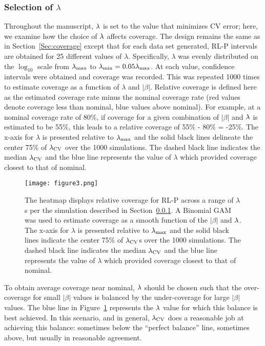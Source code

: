 \subsubsection{Selection of \texorpdfstring{$\lambda$}{lambda}} \label{Sec:lambda}

Throughout the manuscript, $\lambda$ is set to the value that minimizes CV error; here, we examine how the choice of $\lambda$ affects coverage. The design remains the same as in Section~\ref{Sec:coverage} except that for each data set generated, RL-P intervals are obtained for 25 different values of $\lambda$. Specifically, $\lambda$ was evenly distributed on the $\log_{10}$ scale from $\lambda_{\max}$ to $\lambda_{\min} = 0.05 \lambda_{\max}$. At each value, confidence intervals were obtained and coverage was recorded. This was repeated 1000 times to estimate coverage as a function of $\lambda$ and $|\beta|$. Relative coverage is defined here as the estimated coverage rate minus the nominal coverage rate (red values denote coverage less than nominal, blue values above nominal). For example, at a nominal coverage rate of 80\%, if coverage for a given combination of $|\beta|$ and $\lambda$ is estimated to be 55\%, this leads to a relative coverage of 55\% - 80\% = -25\%. The x-axis for $\lambda$ is presented relative to $\lambda_{\max}$ and the solid black lines delineate the center 75\% of $\lambda_{\textrm{CV}}$ over the 1000 simulations. The dashed black line indicates the median $\lambda_{\textrm{CV}}$ and the blue line represents the value of $\lambda$ which provided coverage closest to that of nominal.

\begin{figure}[htb!]
  \begin{center}
    \texttt{[image: figure3.png]}
    \caption{\label{Fig:beta_lambda_heatmap_laplace} The heatmap displays relative coverage for RL-P across a range of $\lambda$s per the simulation described in Section~\ref{Sec:lambda}. A Binomial GAM was used to estimate coverage as a smooth function of the $|\beta|$ and $\lambda$. The x-axis for $\lambda$ is presented relative to $\lambda_{\max}$ and the solid black lines indicate the center 75\% of $\lambda_{\textrm{CV}}$s over the 1000 simulations. The dashed black line indicates the median $\lambda_{\textrm{CV}}$ and the blue line represents the value of $\lambda$ which provided coverage closest to that of nominal.}
  \end{center}
\end{figure}

To obtain average coverage near nominal, $\lambda$ should be chosen such that the over-coverage for small $|\beta|$ values is balanced by the under-coverage for large $|\beta|$ values. The blue line in Figure~\ref{Fig:beta_lambda_heatmap_laplace} represents the $\lambda$ value for which this balance is best achieved. In this scenario, and in general, $\lambda_{\textrm{CV}}$ does a reasonable job at achieving this balance: sometimes below the ``perfect balance'' line, sometimes above, but usually in reasonable agreement.


